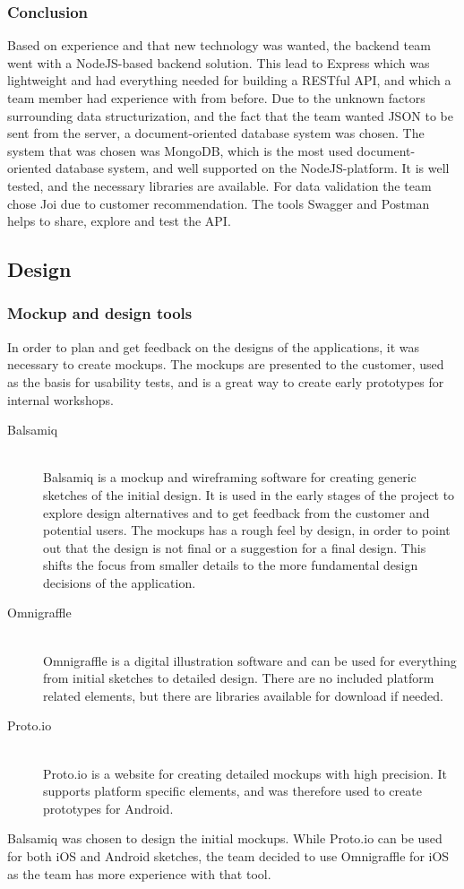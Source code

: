 \subsubsection{Conclusion}
Based on experience and that new technology was wanted, the backend team went with a NodeJS-based backend solution. This lead to Express which was lightweight and had everything needed for building a RESTful API, and which a team member had experience with from before. Due to the unknown factors surrounding data structurization, and the fact that the team wanted JSON to be sent from the server, a document-oriented database system was chosen. The system that was chosen was MongoDB, which is the most used document-oriented database system, and well supported on the NodeJS-platform. It is well tested, and the necessary libraries are available. For data validation the team chose Joi due to customer recommendation. The tools Swagger and Postman helps to share, explore and test the API.


\subsection{Design}

\subsubsection{Mockup and design tools}
In order to plan and get feedback on the designs of the applications, it was necessary to create mockups. The mockups are presented to the customer, used as the basis for usability tests, and is a great way to create early prototypes for internal workshops. 

\begin{description}
    \item[Balsamiq] \hfill \\
        Balsamiq is a mockup and wireframing software for creating generic sketches of the initial design. It is used in the early stages of the project to explore design alternatives and to get feedback from the customer and potential users. The mockups has a rough feel by design, in order to point out that the design is not final or a suggestion for a final design. This shifts the focus from smaller details to the more fundamental design decisions of the application.\cite{balsamiq}
    \item[Omnigraffle] \hfill \\
        Omnigraffle is a digital illustration software and can be used for everything from initial sketches to detailed design. There are no included platform related elements, but there are libraries available for download if needed.\cite{omnigraffle} 
    \item[Proto.io] \hfill \\
        Proto.io is a website for creating detailed mockups with high precision. It supports platform specific elements, and was therefore used to create prototypes for Android.\cite{protoio}
\end{description}

Balsamiq was chosen to design the initial mockups. While Proto.io can be used for both iOS and Android sketches, the team decided to use Omnigraffle for iOS as the team has more experience with that tool. 
